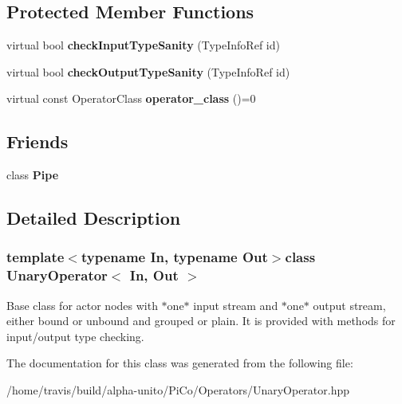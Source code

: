 \subsection*{\-Protected \-Member \-Functions}
\begin{DoxyCompactItemize}
\item 
\hypertarget{class_unary_operator_a149286573d17c78732465b5ba66514c2}{virtual bool {\bfseries check\-Input\-Type\-Sanity} (\-Type\-Info\-Ref id)}\label{class_unary_operator_a149286573d17c78732465b5ba66514c2}

\item 
\hypertarget{class_unary_operator_a5dc4cd8d71523d8de26132c8b32aa755}{virtual bool {\bfseries check\-Output\-Type\-Sanity} (\-Type\-Info\-Ref id)}\label{class_unary_operator_a5dc4cd8d71523d8de26132c8b32aa755}

\item 
\hypertarget{class_unary_operator_a2ce8b32a213fb78eacedb2d30f1a1e0e}{virtual const \-Operator\-Class {\bfseries operator\-\_\-class} ()=0}\label{class_unary_operator_a2ce8b32a213fb78eacedb2d30f1a1e0e}

\end{DoxyCompactItemize}
\subsection*{\-Friends}
\begin{DoxyCompactItemize}
\item 
\hypertarget{class_unary_operator_adb788d0aa2d64624d3602a985936d7da}{class {\bfseries \-Pipe}}\label{class_unary_operator_adb788d0aa2d64624d3602a985936d7da}

\end{DoxyCompactItemize}


\subsection{\-Detailed \-Description}
\subsubsection*{template$<$typename \-In, typename \-Out$>$class Unary\-Operator$<$ In, Out $>$}

\-Base class for actor nodes with $\ast$one$\ast$ input stream and $\ast$one$\ast$ output stream, either bound or unbound and grouped or plain. \-It is provided with methods for input/output type checking. 

\-The documentation for this class was generated from the following file\-:\begin{DoxyCompactItemize}
\item 
/home/travis/build/alpha-\/unito/\-Pi\-Co/\-Operators/\-Unary\-Operator.\-hpp\end{DoxyCompactItemize}
